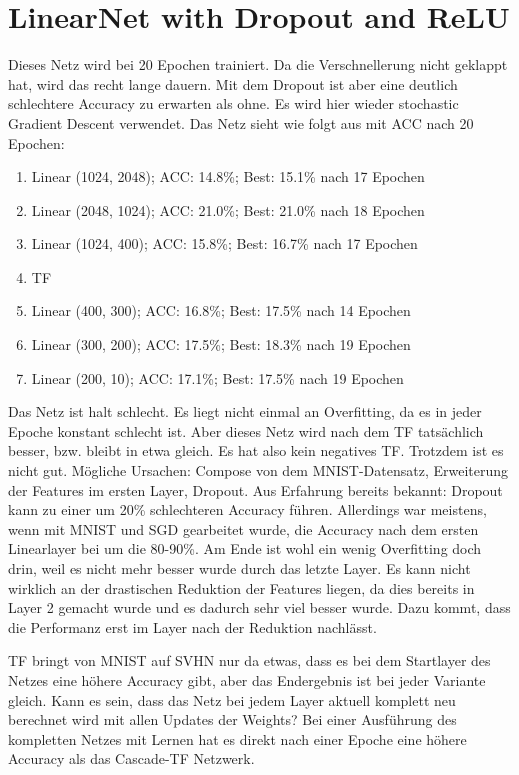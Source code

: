 \section{LinearNet with Dropout and ReLU}
    Dieses Netz wird bei 20 Epochen trainiert. Da die Verschnellerung nicht geklappt hat, 
    wird das recht lange dauern. Mit dem Dropout ist aber eine deutlich schlechtere Accuracy 
    zu erwarten als ohne. Es wird hier wieder stochastic Gradient Descent verwendet. 
    Das Netz sieht wie folgt aus mit ACC nach 20 Epochen: 
    \begin{enumerate}
        \item Linear (1024, 2048); ACC: 14.8\%; Best: 15.1\% nach 17 Epochen
        \item Linear (2048, 1024); ACC: 21.0\%; Best: 21.0\% nach 18 Epochen
        \item Linear (1024, 400); ACC: 15.8\%; Best: 16.7\% nach 17 Epochen
        \item TF
        \item Linear (400, 300); ACC: 16.8\%; Best: 17.5\% nach 14 Epochen
        \item Linear (300, 200); ACC: 17.5\%; Best: 18.3\% nach 19 Epochen
        \item Linear (200, 10); ACC: 17.1\%; Best: 17.5\% nach 19 Epochen
    \end{enumerate}
    Das Netz ist halt schlecht. Es liegt nicht einmal an Overfitting, da es in jeder Epoche 
    konstant schlecht ist.
    Aber dieses Netz wird nach dem TF tatsächlich besser, bzw. bleibt in etwa gleich. 
    Es hat also kein negatives TF. Trotzdem ist es nicht gut. Mögliche Ursachen: 
    Compose von dem MNIST-Datensatz, Erweiterung der Features im ersten Layer, Dropout. 
    Aus Erfahrung bereits bekannt: Dropout kann zu einer um 20\% schlechteren Accuracy 
    führen. 
    Allerdings war meistens, wenn mit MNIST und SGD gearbeitet wurde, die Accuracy nach dem 
    ersten Linearlayer bei um die 80-90\%. 
    Am Ende ist wohl ein wenig Overfitting doch drin, weil es nicht mehr besser wurde durch 
    das letzte Layer. Es kann nicht wirklich an der drastischen Reduktion der Features liegen, 
    da dies bereits in Layer 2 gemacht wurde und es dadurch sehr viel besser wurde. Dazu kommt, 
    dass die Performanz erst im Layer nach der Reduktion nachlässt.

    TF bringt von MNIST auf SVHN nur da etwas, dass es bei dem Startlayer des Netzes eine 
    höhere Accuracy gibt, aber das Endergebnis ist bei jeder Variante gleich. Kann es sein, dass 
    das Netz bei jedem Layer aktuell komplett neu berechnet wird mit allen Updates der Weights?
    Bei einer Ausführung des kompletten Netzes mit Lernen hat es direkt nach einer Epoche eine 
    höhere Accuracy als das Cascade-TF Netzwerk.

